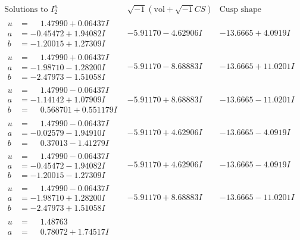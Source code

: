 \documentclass[1p]{elsarticle_modified}
\theoremstyle{definition}
\newcommand{\I}{\sqrt{-1}}
\begin{document}
$$\begin{array}{c|c|c}
\text{Solutions to }I^u_{2}& \I (\text{vol} + \sqrt{-1}CS) & \text{Cusp shape}\\
 \hline 
\begin{aligned}
u &= \phantom{-}1.47990 + 0.06437 I \\
a &= -0.45472 + 1.94082 I \\
b &= -1.20015 + 1.27309 I\end{aligned}
 & -5.91170 - 4.62906 I & -13.6665 + 4.0919 I \\ \hline\begin{aligned}
u &= \phantom{-}1.47990 + 0.06437 I \\
a &= -1.98710 - 1.28200 I \\
b &= -2.47973 - 1.51058 I\end{aligned}
 & -5.91170 - 8.68883 I & -13.6665 + 11.0201 I \\ \hline\begin{aligned}
u &= \phantom{-}1.47990 - 0.06437 I \\
a &= -1.14142 + 1.07909 I \\
b &= \phantom{-}0.568701 + 0.551179 I\end{aligned}
 & -5.91170 + 8.68883 I & -13.6665 - 11.0201 I \\ \hline\begin{aligned}
u &= \phantom{-}1.47990 - 0.06437 I \\
a &= -0.02579 - 1.94910 I \\
b &= \phantom{-}0.37013 - 1.41279 I\end{aligned}
 & -5.91170 + 4.62906 I & -13.6665 - 4.0919 I \\ \hline\begin{aligned}
u &= \phantom{-}1.47990 - 0.06437 I \\
a &= -0.45472 - 1.94082 I \\
b &= -1.20015 - 1.27309 I\end{aligned}
 & -5.91170 + 4.62906 I & -13.6665 - 4.0919 I \\ \hline\begin{aligned}
u &= \phantom{-}1.47990 - 0.06437 I \\
a &= -1.98710 + 1.28200 I \\
b &= -2.47973 + 1.51058 I\end{aligned}
 & -5.91170 + 8.68883 I & -13.6665 - 11.0201 I \\ \hline\begin{aligned}
u &= \phantom{-}1.48763\phantom{ +0.000000I} \\
a &= \phantom{-}0.78072 + 1.74517 I \\

\end{aligned}
\end{array}$$
\end{document}
